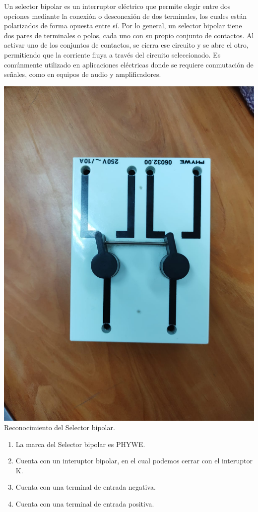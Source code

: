 \documentclass[10pt]{article}
\begin{document}
\begin{multicols}{2}
Un selector bipolar es un interruptor eléctrico que permite elegir entre dos opciones mediante la conexión o desconexión de dos terminales, los cuales están polarizados de forma opuesta entre sí. Por lo general, un selector bipolar tiene dos pares de terminales o polos, cada uno con su propio conjunto de contactos. Al activar uno de los conjuntos de contactos, se cierra ese circuito y se abre el otro, permitiendo que la corriente fluya a través del circuito seleccionado. Es comúnmente utilizado en aplicaciones eléctricas donde se requiere conmutación de señales, como en equipos de audio y amplificadores.

\begin{center}
\includegraphics[scale=0.1]{Selector}\\
Reconocimiento del Selector bipolar.
\begin{enumerate}
\item La marca del Selector bipolar es PHYWE.
\item Cuenta con un interuptor bipolar, en el cual podemos cerrar con el interuptor K.
\item Cuenta con una terminal de entrada negativa.
\item Cuenta con una terminal de entrada positiva.
\end{enumerate}
\end{center}


\end{multicols}
\end{document}
